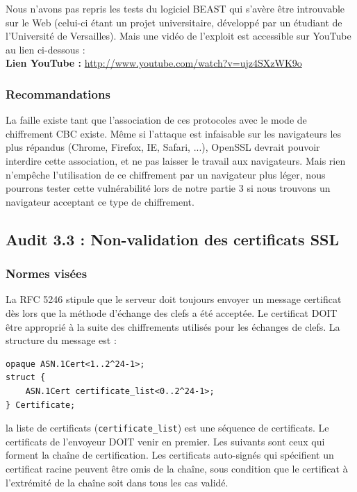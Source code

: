 Nous n'avons pas repris les tests du logiciel BEAST qui s'avère être introuvable sur le Web (celui-ci étant un projet universitaire, développé par un étudiant de l'Université de Versailles). Mais une vidéo de l'exploit est accessible sur YouTube au lien ci-dessous : \\

\textbf{Lien YouTube : } \href{http://www.youtube.com/watch?v=ujz4SXzWK9o} {http://www.youtube.com/watch?v=ujz4SXzWK9o}

\subsubsection{Recommandations}

La faille existe tant que l'association de ces protocoles avec le mode de chiffrement CBC existe. Même si l'attaque est infaisable sur les navigateurs les plus répandus (Chrome, Firefox, IE, Safari, ...), OpenSSL devrait pouvoir interdire cette association, et ne pas laisser le travail aux navigateurs. Mais rien n'empêche l'utilisation de ce chiffrement par un navigateur plus léger, nous pourrons tester cette vulnérabilité lors de notre partie 3 si nous trouvons un navigateur acceptant ce type de chiffrement.

\subsection{Audit 3.3 : Non-validation des certificats SSL}
\subsubsection{Normes visées}

La RFC 5246 \cite{rfc5246} stipule que le serveur doit toujours envoyer un message certificat dès lors que la méthode d'échange des clefs a été acceptée. 
Le certificat DOIT être approprié à la suite des chiffrements utilisés pour les échanges de clefs.
La structure du message est : 

\begin{verbatim} 
opaque ASN.1Cert<1..2^24-1>;
struct {
    ASN.1Cert certificate_list<0..2^24-1>;
} Certificate;
\end{verbatim}

la liste de certificats (\texttt{certificate\_list}) est une séquence de certificats. Le certificats de l'envoyeur DOIT venir en premier. Les suivants sont ceux qui forment la chaîne de certification. Les certificats auto-signés qui spécifient un certificat racine peuvent être omis de la chaîne, sous condition que le certificat à l'extrémité de la chaîne soit dans tous les cas validé.\\

